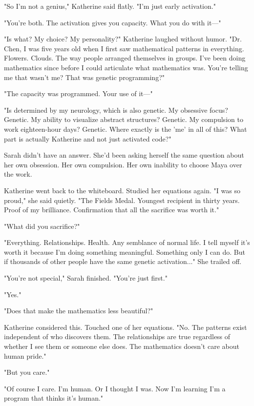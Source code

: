 "So I'm not a genius," Katherine said flatly. "I'm just early activation."

"You're both. The activation gives you capacity. What you do with it—"

"Is what? My choice? My personality?" Katherine laughed without humor. "Dr. Chen, I was five years old when I first saw mathematical patterns in everything. Flowers. Clouds. The way people arranged themselves in groups. I've been doing mathematics since before I could articulate what mathematics was. You're telling me that wasn't me? That was genetic programming?"

"The capacity was programmed. Your use of it—"

"Is determined by my neurology, which is also genetic. My obsessive focus? Genetic. My ability to visualize abstract structures? Genetic. My compulsion to work eighteen-hour days? Genetic. Where exactly is the 'me' in all of this? What part is actually Katherine and not just activated code?"

Sarah didn't have an answer. She'd been asking herself the same question about her own obsession. Her own compulsion. Her own inability to choose Maya over the work.

Katherine went back to the whiteboard. Studied her equations again. "I was so proud," she said quietly. "The Fields Medal. Youngest recipient in thirty years. Proof of my brilliance. Confirmation that all the sacrifice was worth it."

"What did you sacrifice?"

"Everything. Relationships. Health. Any semblance of normal life. I tell myself it's worth it because I'm doing something meaningful. Something only I can do. But if thousands of other people have the same genetic activation..." She trailed off.

"You're not special," Sarah finished. "You're just first."

"Yes."

"Does that make the mathematics less beautiful?"

Katherine considered this. Touched one of her equations. "No. The patterns exist independent of who discovers them. The relationships are true regardless of whether I see them or someone else does. The mathematics doesn't care about human pride."

"But you care."

"Of course I care. I'm human. Or I thought I was. Now I'm learning I'm a program that thinks it's human."

